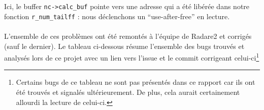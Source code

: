 Ici, le buffer \lstinline{nc->calc_buf} pointe vers une adresse qui a été libérée dans notre fonction \lstinline{r_num_tailff} : nous déclenchons un ``use-after-free'' en lecture.

\paragraph{}
L'ensemble de ces problèmes ont été remontés à l'équipe de Radare2 et corrigés (sauf le dernier).
Le tableau ci-dessous résume l'ensemble des bugs trouvés et analysés lors de ce projet avec un lien vers l'issue et le commit corrigeant celui-ci\footnote{Certains bugs de ce tableau ne sont pas présentés dans ce rapport car ils ont été trouvés et signalés ultérieurement. De plus, cela aurait certainement allourdi la lecture de celui-ci.}

